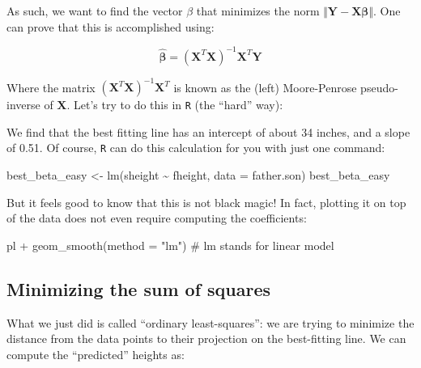 \documentclass[
  letterpaper,
  DIV=11,
  numbers=noendperiod]{scrreprt}
\newenvironment{Shaded}{\begin{snugshade}}{\end{snugshade}}
\newcommand{\NormalTok}[1]{\textcolor[rgb]{0.00,0.23,0.31}{#1}}
\begin{document}
As such, we want to find the vector \(\beta\) that minimizes the norm
\(\Vert \mathbf{Y} - \mathbf{X} \mathbf{\beta} \Vert\). One can prove
that this is accomplished using:

\[
\hat{\mathbf{\beta}} = \left( \mathbf{X}^T \mathbf{X} \right)^{-1} \mathbf{X}^T \mathbf{Y}
\]

Where the matrix
\(\left( \mathbf{X}^T \mathbf{X} \right)^{-1} \mathbf{X}^T\) is known as
the (left) Moore-Penrose pseudo-inverse of \(\mathbf{X}\). Let's try to
do this in \texttt{R} (the ``hard'' way):

\begin{Shaded}
\end{Shaded}

We find that the best fitting line has an intercept of about 34 inches,
and a slope of 0.51. Of course, \texttt{R} can do this calculation for
you with just one command:

\begin{Shaded}
\begin{Highlighting}[]
\NormalTok{best\_beta\_easy \textless{}{-} lm(sheight \textasciitilde{} fheight, data = father.son)}
\NormalTok{best\_beta\_easy}
\end{Highlighting}
\end{Shaded}

But it feels good to know that this is not black magic! In fact,
plotting it on top of the data does not even require computing the
coefficients:

\begin{Shaded}
\begin{Highlighting}[]
\NormalTok{pl + geom\_smooth(method = "lm") \# lm stands for linear model}
\end{Highlighting}
\end{Shaded}

\subsection{Minimizing the sum of
squares}\label{minimizing-the-sum-of-squares}

What we just did is called ``ordinary least-squares'': we are trying to
minimize the distance from the data points to their projection on the
best-fitting line. We can compute the ``predicted'' heights as:
\end{document}
